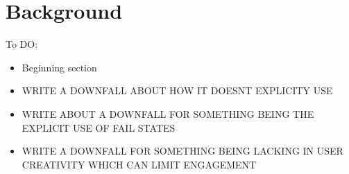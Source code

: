 \documentclass{l4proj}
\begin{document}




    


\chapter{Background}
To DO:
\begin{itemize}
    \item Beginning section
    \item WRITE A DOWNFALL ABOUT HOW IT DOESNT EXPLICITY USE 
    \item WRITE ABOUT A DOWNFALL FOR SOMETHING BEING THE EXPLICIT USE OF FAIL STATES
    \item WRITE A DOWNFALL FOR SOMETHING BEING LACKING IN USER CREATIVITY WHICH CAN LIMIT ENGAGEMENT
\end{itemize}
\end{document}
